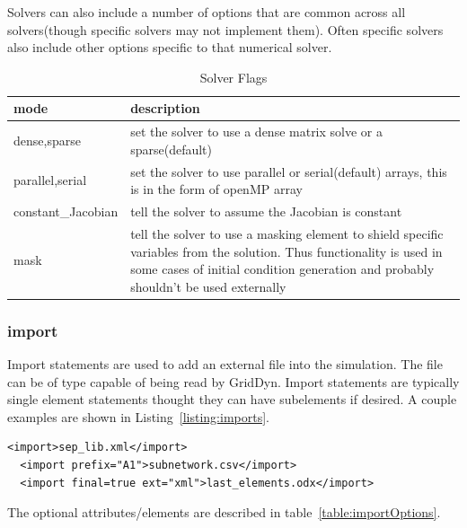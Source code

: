 \documentclass[12pt]{article} %
\begin{document}
   Solvers can also include a number of options that are common across all solvers(though specific solvers may not implement them).  Often specific solvers also include other options specific to that numerical solver.  
   \begin{table}[ht]
   	
   	\caption{Solver Flags} %
   	\centering %
   	\begin{tabular}{l p{10cm}} %
   		\hline %
   		mode & description \\ [0.5ex] %
   		\hline %
   		dense,sparse & set the solver to use a dense matrix solve or a sparse(default) \\
   		parallel,serial & set the solver to use parallel or serial(default) arrays, this is in the form of openMP array \\
   		constant\_Jacobian & tell the solver to assume the Jacobian is constant \\
   		mask & tell the solver to use a masking element to shield specific variables from the solution.  Thus functionality is used in some cases of initial condition generation and probably shouldn't be used externally\\
   		\hline %
   	\end{tabular}
   	\label{table:solverFlags}
   \end{table}
 
  \subsubsection{import}
  Import statements are used to add an external file into the simulation.  The file can be of type capable of being read by GridDyn.
  Import statements are typically single element statements thought they can have subelements if desired.  A couple examples are shown in Listing~\ref{listing:imports}.
  \begin{lstlisting}[caption={Examples of import statements}, label={listing:imports} ]
  <import>sep_lib.xml</import>
  <import prefix="A1">subnetwork.csv</import>
  <import final=true ext="xml">last_elements.odx</import>
  \end{lstlisting} 
  The optional attributes/elements are described in table~\ref{table:importOptions}.
  
\end{document}
